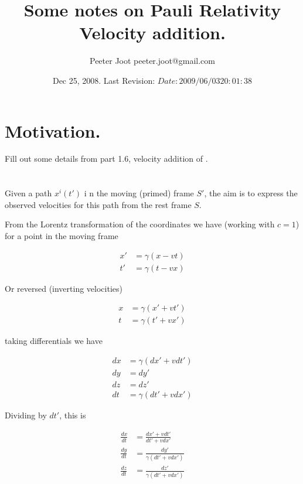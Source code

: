 \documentclass{article}
\title{ Some notes on Pauli Relativity Velocity addition. }
\author{Peeter Joot \quad peeter.joot@gmail.com}
\date{ Dec 25, 2008.  Last Revision: $Date: 2009/06/03 20:01:38 $ }
\begin{document}
\maketitle{}
%

\section{Motivation. }

Fill out some details from part 1.6, velocity addition of \cite{pauli1981tr}.

\section{}

Given a path $x^i(t')$ i n the moving (primed) frame $S'$, the aim is to 
express the observed velocities for this path from the rest frame $S$.

From the Lorentz transformation of the coordinates we have (working with $c=1$) for a point in the moving frame

\begin{align*}
x' &= \gamma ( x - vt) \\
t' &= \gamma ( t - vx)
\end{align*}

Or reversed (inverting velocities)

\begin{align*}
x &= \gamma ( x' + vt') \\
t &= \gamma ( t' + vx')
\end{align*}

taking differentials we have

\begin{align*}
dx &= \gamma ( dx' + v dt') \\
dy &= dy' \\
dz &= dz' \\
dt &= \gamma ( dt' + v dx')
\end{align*}

Dividing by $dt'$, this is

\begin{align*}
\frac{dx}{dt} &= \frac{ dx' + v dt' }{ dt' + v dx'} \\
\frac{dy}{dt} &= \frac{dy'}{\gamma (dt' + v dx')} \\
\frac{dz}{dt} &= \frac{dz'}{\gamma (dt' + v dx')} \\
\end{align*}
\end{document}

